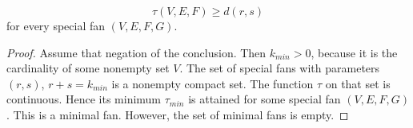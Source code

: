 \begin{corollary}\label{lemma:empty-d}
$$
\tau(V,E,F) \ge d (r,s)
$$
for every special fan $(V,E,F,G)$.
\end{corollary}

\begin{proof} Assume that negation of the conclusion.  
Then $k_{min}>0$, because it is the cardinality of some nonempty set $V$.
The set of special fans with parameters $(r,s)$, $r+s=k_{min}$ is a nonempty 
compact
set.  The function $\tau$ on that set is continuous.  Hence its minimum
$\tau_{min}$ is attained for some special fan $(V,E,F,G)$.  This is a minimal fan.
However, the set of minimal fans is empty.
\end{proof}



